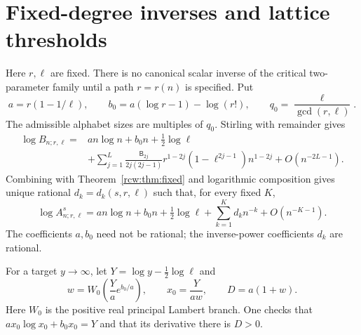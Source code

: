 \documentclass[11pt]{article}
\theoremstyle{definition}\newtheorem{definition}[theorem]{Definition}
\theoremstyle{remark}\newtheorem{remark}[theorem]{Remark}
\newcommand{\A}{A^s_{n;r,\ell}}
\newcommand{\B}{B_{n;r,\ell}}
\numberwithin{equation}{section}
\begin{document}
\section{Fixed-degree inverses and lattice thresholds}\label{rcw:sec:inverse}
Here $r,\ell$ are fixed. There is no canonical scalar inverse of the critical two-parameter family until a path $r=r(n)$ is specified. Put
\begin{equation}\label{rcw:eq:ab}
 a=r(1-1/\ell),\qquad
 b_0=a(\log r-1)-\log(r!),\qquad
 q_0=\frac\ell{\gcd(r,\ell)}.
\end{equation}
The admissible alphabet sizes are multiples of $q_0$. Stirling with remainder gives
\begin{align}\label{rcw:eq:logB}
 \log\B={}&a n\log n+b_0n+\tfrac12\log\ell\nonumber\\
 &+\sum_{j=1}^L\frac{\mathsf B_{2j}}{2j(2j-1)}
       r^{1-2j}(1-\ell^{2j-1})n^{1-2j}
       +O(n^{-2L-1}).
\end{align}
Combining with Theorem~\ref{rcw:thm:fixed} and logarithmic composition gives unique rational $d_k=d_k(s,r,\ell)$ such that, for every fixed $K$,
\begin{equation}\label{rcw:eq:logA}
 \log\A=a n\log n+b_0n+\tfrac12\log\ell
       +\sum_{k=1}^K d_kn^{-k}+O(n^{-K-1}).
\end{equation}
The coefficients $a,b_0$ need not be rational; the inverse-power coefficients $d_k$ are rational.

For a target $y\to\infty$, let $Y=\log y-\tfrac12\log\ell$ and
\begin{equation}\label{rcw:eq:lambert}
 w=W_0\!\left(\frac Ya e^{b_0/a}\right),\qquad
 x_0=\frac{Y}{a w},\qquad D=a(1+w).
\end{equation}
Here $W_0$ is the positive real principal Lambert branch. One checks that
$a x_0\log x_0+b_0x_0=Y$ and that its derivative there is $D>0$.
\end{document}
